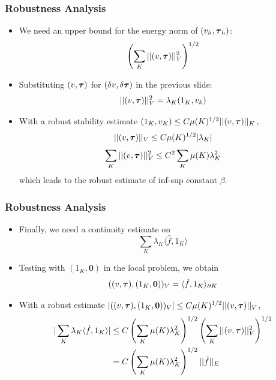 \documentclass{beamer}
\begin{document}
\begin{frame}
\frametitle{Robustness Analysis}
\begin{itemize}
    \item We need an upper bound for the energy norm of $(v_h,\boldsymbol\tau_h)$:
      \[
      \left( \sum_K||(v,\boldsymbol\tau)||^2_V \right)^{1/2}
      \]
    \item Substituting $(v,\boldsymbol\tau)$ for $(\delta v,\delta\boldsymbol\tau)$ in the
      previous slide:
      \[
      ||(v,\boldsymbol\tau)||^2_V=\lambda_K(1_K,v_k)
      \]
    \item With a robust stability estimate
      $
      (1_K,v_K)\leq C\mu(K)^{1/2}||(v,\boldsymbol\tau)||_K\,,
      $
      \[
      ||(v,\boldsymbol\tau)||_V\leq C\mu(K)^{1/2}|\lambda_K|
      \]
      \[
      \sum_K||(v,\boldsymbol\tau)||_V^2\leq C^2\sum_K\mu(K)\lambda_K^2
      \]
      which leads to the robust estimate of inf-sup constant $\beta$.
\end{itemize}
\end{frame}

\begin{frame}
\frametitle{Robustness Analysis}
\begin{itemize}
    \item Finally, we need a continuity estimate on
      \[
      \sum_K\lambda_K\langle\hat f,1_K\rangle
      \]
    \item Testing with $(1_K,\boldsymbol0)$ in the local problem, we obtain
      \[
      ( (v,\boldsymbol\tau),(1_K,\boldsymbol0) )_V=\langle\hat f,1_K\rangle_{\partial K}
      \]
    \item With a robust estimate $|( (v,\boldsymbol\tau),(1_K,\boldsymbol0) )_V|\leq
      C\mu(K)^{1/2}||(v,\boldsymbol\tau)||_V$,
      \begin{align*}
        |\sum_K\lambda_K\langle\hat f,1_K\rangle|
        &\leq C\left( \sum_K\mu(K)\lambda_K^2 \right)^{1/2}\left( \sum_K||(v,\boldsymbol\tau)||_V^2 \right)^{1/2}\\
        &=C\left( \sum_K\mu(K)\lambda_K^2 \right)^{1/2}||\hat f||_E
      \end{align*}
\end{itemize}
\end{frame}

\end{document}
